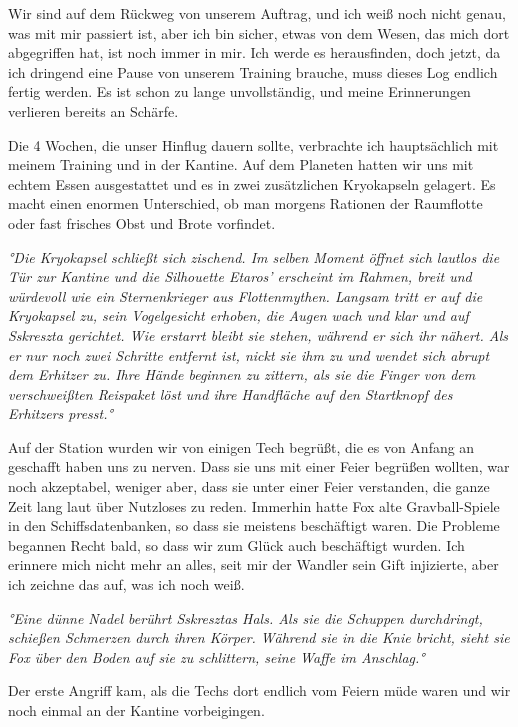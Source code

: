 \documentclass[11pt]{article}
\begin{document}
Wir sind auf dem Rückweg von unserem Auftrag, und ich weiß noch nicht
genau, was mit mir passiert ist, aber ich bin sicher, etwas von dem
Wesen, das mich dort abgegriffen hat, ist noch immer in mir. Ich werde
es herausfinden, doch jetzt, da ich dringend eine Pause von unserem
Training brauche, muss dieses Log endlich fertig werden. Es ist schon zu
lange unvollständig, und meine Erinnerungen verlieren bereits an
Schärfe.

Die 4 Wochen, die unser Hinflug dauern sollte, verbrachte ich
hauptsächlich mit meinem Training und in der Kantine. Auf dem Planeten
hatten wir uns mit echtem Essen ausgestattet und es in zwei zusätzlichen
Kryokapseln gelagert. Es macht einen enormen Unterschied, ob man morgens
Rationen der Raumflotte oder fast frisches Obst und Brote vorfindet.

\emph{°Die Kryokapsel schließt sich zischend. Im selben Moment öffnet
sich lautlos die Tür zur Kantine und die Silhouette Etaros' erscheint im
Rahmen, breit und würdevoll wie ein Sternenkrieger aus Flottenmythen.
Langsam tritt er auf die Kryokapsel zu, sein Vogelgesicht erhoben, die
Augen wach und klar und auf Sskreszta gerichtet. Wie erstarrt bleibt sie
stehen, während er sich ihr nähert. Als er nur noch zwei Schritte
entfernt ist, nickt sie ihm zu und wendet sich abrupt dem Erhitzer zu.
Ihre Hände beginnen zu zittern, als sie die Finger von dem verschweißten
Reispaket löst und ihre Handfläche auf den Startknopf des Erhitzers
presst.°}

Auf der Station wurden wir von einigen Tech begrüßt, die es von Anfang
an geschafft haben uns zu nerven. Dass sie uns mit einer Feier begrüßen
wollten, war noch akzeptabel, weniger aber, dass sie unter einer Feier
verstanden, die ganze Zeit lang laut über Nutzloses zu reden. Immerhin
hatte Fox alte Gravball-Spiele in den Schiffsdatenbanken, so dass sie
meistens beschäftigt waren. Die Probleme begannen Recht bald, so dass
wir zum Glück auch beschäftigt wurden. Ich erinnere mich nicht mehr an
alles, seit mir der Wandler sein Gift injizierte, aber ich zeichne das
auf, was ich noch weiß.

\emph{°Eine dünne Nadel berührt Sskresztas Hals. Als sie die Schuppen
durchdringt, schießen Schmerzen durch ihren Körper. Während sie in die
Knie bricht, sieht sie Fox über den Boden auf sie zu schlittern, seine
Waffe im Anschlag.°}

Der erste Angriff kam, als die Techs dort endlich vom Feiern müde waren
und wir noch einmal an der Kantine vorbeigingen.
\end{document}
